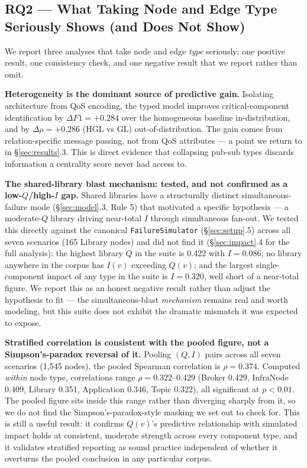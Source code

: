\documentclass[review]{elsarticle}
\begin{document}
\subsection{RQ2 --- What Taking Node and Edge Type Seriously Shows (and Does Not Show)}

We report three analyses that take node and edge \emph{type} seriously: one positive result, one
consistency check, and one negative result that we report rather than omit.

\textbf{Heterogeneity is the dominant source of predictive gain.} Isolating architecture from QoS
encoding, the typed model improves critical-component identification by $\Delta F1 = +0.284$ over
the homogeneous baseline in-distribution, and by $\Delta\rho = +0.286$ (HGL vs GL)
out-of-distribution. The gain comes from relation-specific message passing, not from QoS attributes
--- a point we return to in \S\ref{sec:results}.3. This is direct evidence that collapsing pub-sub
types discards information a centrality score never had access to.

\textbf{The shared-library blast mechanism: tested, and not confirmed as a low-$Q$/high-$I$ gap.}
Shared libraries have a structurally distinct simultaneous-failure mode (\S\ref{sec:model}.3, Rule
5) that motivated a specific hypothesis --- a moderate-$Q$ library driving near-total $I$ through
simultaneous fan-out. We tested this directly against the canonical \texttt{FailureSimulator}
(\S\ref{sec:setup}.5) across all seven scenarios (165 Library nodes) and did not find it
(\S\ref{sec:impact}.4 for the full analysis): the highest library $Q$ in the suite is 0.422 with $I =
0.086$; no library anywhere in the corpus has $I(v)$ exceeding $Q(v)$; and the largest
single-component impact of any type in the suite is $I = 0.320$, well short of a near-total figure.
We report this as an honest negative result rather than adjust the hypothesis to fit --- the
simultaneous-blast \emph{mechanism} remains real and worth modeling, but this suite does not exhibit
the dramatic mismatch it was expected to expose.

\textbf{Stratified correlation is consistent with the pooled figure, not a Simpson's-paradox
reversal of it.} Pooling $(Q,I)$ pairs across all seven scenarios (1,545 nodes), the pooled Spearman
correlation is $\rho = 0.374$. Computed \emph{within} node type, correlations range $\rho =
0.322$--$0.429$ (Broker 0.429, InfraNode 0.409, Library 0.351, Application 0.346, Topic 0.322), all
significant at $p<0.01$. The pooled figure sits inside this range rather than diverging sharply from
it, so we do not find the Simpson's-paradox-style masking we set out to check for. This is still a
useful result: it confirms $Q(v)$'s predictive relationship with simulated impact holds at
consistent, moderate strength across every component type, and it validates stratified reporting as
sound practice independent of whether it overturns the pooled conclusion in any particular corpus.
\end{document}
